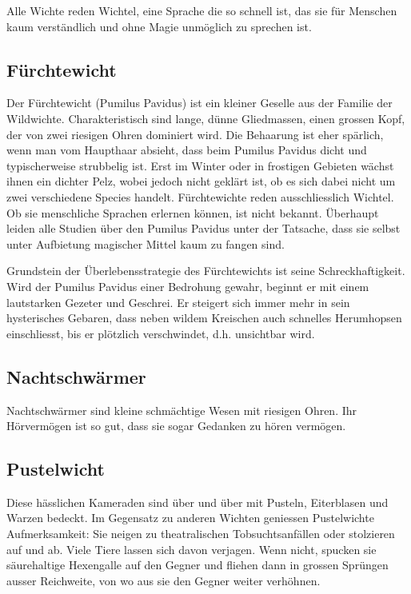 \documentclass[12pt,twoside,twocolumn,openany]{book}
\begin{document}
Alle Wichte reden Wichtel, eine Sprache die so schnell ist, das sie für Menschen kaum verständlich und ohne Magie unmöglich zu sprechen ist.



\subsection{Fürchtewicht}
Der Fürchtewicht (Pumilus Pavidus) ist ein kleiner Geselle aus der Familie der Wildwichte. Charakteristisch sind lange, dünne Gliedmassen, einen grossen Kopf, der von zwei riesigen Ohren dominiert wird. Die Behaarung ist eher spärlich, wenn man vom Haupthaar absieht, dass beim Pumilus Pavidus dicht und typischerweise strubbelig ist. Erst im Winter oder in frostigen Gebieten wächst ihnen ein dichter Pelz, wobei jedoch nicht geklärt ist, ob es sich dabei nicht um zwei verschiedene Species handelt.
Fürchtewichte reden ausschliesslich Wichtel. Ob sie menschliche Sprachen erlernen können, ist nicht bekannt. Überhaupt leiden alle Studien über den Pumilus Pavidus unter der Tatsache, dass sie selbst unter Aufbietung magischer Mittel kaum zu fangen sind.

Grundstein der Überlebensstrategie des Fürchtewichts ist seine Schreckhaftigkeit. Wird der Pumilus Pavidus einer Bedrohung gewahr, beginnt er mit einem lautstarken Gezeter und Geschrei. Er steigert sich immer mehr in sein hysterisches Gebaren, dass neben wildem Kreischen auch schnelles Herumhopsen einschliesst, bis er plötzlich verschwindet, d.h. unsichtbar wird.

\subsection{Nachtschwärmer}
Nachtschwärmer sind kleine schmächtige Wesen mit riesigen Ohren. Ihr Hörvermögen ist so gut, dass sie sogar Gedanken zu hören vermögen.

\subsection{Pustelwicht}
Diese hässlichen Kameraden sind über und über mit Pusteln, Eiterblasen und Warzen bedeckt. Im Gegensatz zu anderen Wichten geniessen Pustelwichte Aufmerksamkeit: Sie neigen zu theatralischen Tobsuchtsanfällen oder stolzieren auf und ab. Viele Tiere lassen sich davon verjagen. Wenn nicht, spucken sie säurehaltige Hexengalle auf den Gegner und fliehen dann in grossen Sprüngen ausser Reichweite, von wo aus sie den Gegner weiter verhöhnen.
\end{document}
